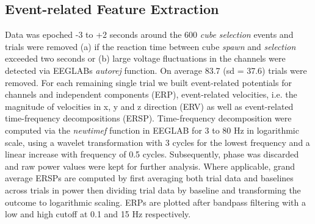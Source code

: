 \subsection{Event-related Feature Extraction}
Data was epoched -3 to +2 seconds around the 600 \textit{cube selection} events and trials were removed (a) if the reaction time between cube \textit{spawn} and \textit{selection} exceeded two seconds or (b) large voltage fluctuations in the channels were detected via EEGLABs \textit{autorej} function. On average 83.7 (sd = 37.6) trials were removed. For each remaining single trial we built event-related potentials for channels and independent components (ERP), event-related velocities, i.e. the magnitude of velocities in x, y and z direction (ERV) as well as event-related time-frequency decompositions (ERSP). Time-frequency decomposition were computed via the \textit{newtimef} function in EEGLAB for 3 to 80 Hz in logarithmic scale, using a wavelet transformation with 3 cycles for the lowest frequency and a linear increase with frequency of 0.5 cycles. Subsequently, phase was discarded and raw power values were kept for further analysis. Where applicable, grand average ERSPs are computed by first averaging both trial data and baselines across trials in power then dividing trial data by baseline and transforming the outcome to logarithmic scaling. ERPs are plotted after bandpass filtering with a low and high cutoff at 0.1 and 15 Hz respectively.

